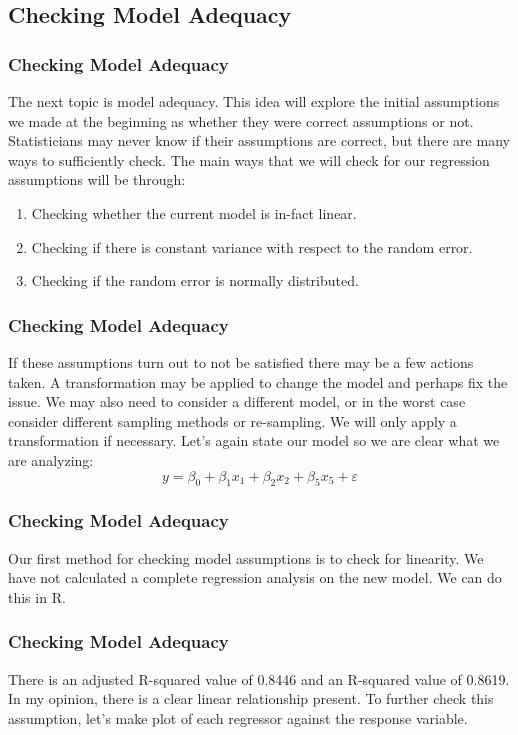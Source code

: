 \documentclass[12pt]{beamer}
\begin{document}
\subsection{Checking Model Adequacy}
\begin{frame}
\frametitle{Checking Model Adequacy}
The next topic is model adequacy. This idea will explore the initial assumptions we made at the beginning as whether they were correct assumptions or not. Statisticians may never know if their assumptions are correct, but there are many ways to sufficiently check. The main ways that we will check for our regression assumptions will be through:
\begin{enumerate}
\item Checking whether the current model is in-fact linear.
\item Checking if there is constant variance with respect to the random error.
\item Checking if the random error is normally distributed.
\end{enumerate}
\end{frame}

\begin{frame}
\frametitle{Checking Model Adequacy}
If these assumptions turn out to not be satisfied there may be a few actions taken. A transformation may be applied to change the model and perhaps fix the issue. We may also need to consider a different model, or in the worst case consider different sampling methods or re-sampling. We will only apply a transformation if necessary. Let's again state our model so we are clear what we are analyzing: $$y=\beta_0+\beta_1x_1+\beta_2x_2+\beta_5x_5+\varepsilon$$
\end{frame}

\begin{frame}
\frametitle{Checking Model Adequacy}
Our first method for checking model assumptions is to check for linearity. We have not calculated a complete regression analysis on the new model. We can do this in R.
{\scriptsize
\begin{mdframed}

\end{mdframed}}
\end{frame}

\begin{frame}
\frametitle{Checking Model Adequacy}
There is an adjusted R-squared value of 0.8446 and an R-squared value of 0.8619. In my opinion, there is a clear linear relationship present. To further check this assumption, let's make plot of each regressor against the response variable.
\end{frame}
\end{document}
